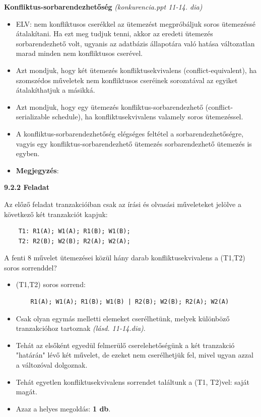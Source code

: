 \documentclass[a4paper,11.5pt, table]{article}
\begin{document}
	\textbf{Konfliktus-sorbarendezhetőség} \textit{(konkurencia.ppt 11-14. dia)}
	\begin{itemize}
		\item ELV: nem konfliktusos cserékkel az ütemezést megpróbáljuk soros ütemezéssé átalakítani. Ha ezt meg tudjuk tenni, akkor az eredeti ütemezés sorbarendezhető volt, ugyanis az adatbázis állapotára való hatása változatlan marad minden nem konfliktusos cserével.
		
		\item Azt mondjuk, hogy két ütemezés konfliktusekvivalens (conflict-equivalent), ha szomszédos műveletek nem konfliktusos cseréinek sorozatával az egyiket átalakíthatjuk a másikká. 
		
		\item Azt mondjuk, hogy egy ütemezés konfliktus-sorbarendezhető (conflict-serializable schedule), ha konfliktusekvivalens valamely soros ütemezéssel. 
		
		\item A konfliktus-sorbarendezhetőség elégséges feltétel a sorbarendezhetőségre, vagyis egy konfliktus-sorbarendezhető ütemezés sorbarendezhető ütemezés is egyben. 
		
		\item \textbf{Megjegyzés}:
	\end{itemize}

	\textbf{9.2.2 Feladat}
	
	Az előző feladat tranzakcióiban csak az írási és olvasási műveleteket jelölve a következő két tranzakciót kapjuk:
	\begin{lstlisting}
	T1: R1(A); W1(A); R1(B); W1(B);
	T2: R2(B); W2(B); R2(A); W2(A);
	\end{lstlisting}
	A fenti 8 művelet ütemezései közül hány darab konfliktusekvivalens a (T1,T2) soros sorrenddel? 
	\begin{itemize}
		\item (T1,T2) soros sorrend:
		\begin{lstlisting}
	R1(A); W1(A); R1(B); W1(B) | R2(B); W2(B); R2(A); W2(A)
		\end{lstlisting}
		
		\item Csak olyan egymás melletti elemeket cserélhetünk, melyek különböző tranzakcióhoz tartoznak \textit{(lásd. 11-14.dia)}. 
		\item Tehát az elsőként egyedül felmerülő cserelehetőségünk a két tranzakció "határán" lévő két művelet, de ezeket nem cserélhetjük fel, mivel ugyan azzal a változóval dolgoznak.
		\item Tehát egyetlen konfliktusekvivalens sorrendet találtunk a (T1, T2)vel: saját magát.
		\item Azaz a helyes megoldás: \textbf{1 db}.
	\end{itemize}
	
\end{document}
